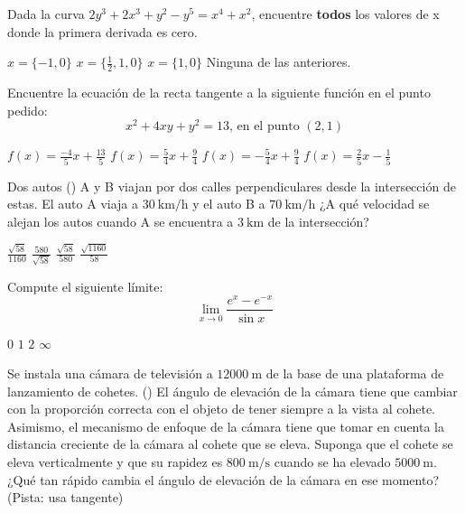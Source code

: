 \pregunta[5] %
Dada la curva $2y^3+2x^3+y^2-y^5=x^4+x^2$, encuentre \textbf{todos} los valores de x donde la primera derivada es cero.
\mostrarpuntaje

\begin{alternativas}
   \alternativa  $x = \{-1, 0\}$
   \alternativaCorrecta$x = \{\frac{1}{2}, 1,0\}$
   \alternativa $x = \{1, 0\}$
   \alternativa Ninguna de las anteriores.
\end{alternativas}
%
\pregunta[5]
Encuentre la ecuación de la recta tangente a la siguiente función en el punto pedido:
$$x^2 + 4xy + y^2 = 13 \text{, en el punto }(2,1)$$
\mostrarpuntaje
\begin{alternativas}
   \alternativaCorrecta $f(x) = \frac{-4}{5}x + \frac{13}{5}$
   \alternativa $f(x) = \frac{5}{4}x + \frac{9}{4}$
   \alternativa $f(x) = -\frac{5}{4}x + \frac{9}{4}$
   \alternativa $f(x) = \frac{2}{5}x - \frac{1}{5}$
\end{alternativas}
%
\pregunta[5]
Dos autos ({\emoji {}}) A y B viajan por dos calles perpendiculares desde la intersección de  estas. El auto A viaja a $\SI{30}{\kilo\meter\per\hour}$ y el auto B a $\SI{70}{\kilo\meter\per\hour}$ ¿A qué velocidad se alejan los autos cuando A se encuentra a $\SI{3}{\kilo\meter}$ de la intersección?
\mostrarpuntaje

\begin{alternativas}
   \alternativa  $\frac{\sqrt{58}}{1160}$
   \alternativaCorrecta$\frac{580}{\sqrt{58}}$
   \alternativa $\frac{\sqrt{58}}{580}$
   \alternativa $\frac{\sqrt{1160}}{58}$
\end{alternativas}
%
\pregunta[5]
Compute el siguiente límite:
$$\lim_{x\to0} \frac{e^x - e^{-x}}{\sin{x}}$$
\mostrarpuntaje

\begin{alternativas}
   \alternativa $0$
   \alternativa $1$
   \alternativaCorrecta$2$
   \alternativa $\infty$
\end{alternativas}
%
\pregunta[5]
Se instala una cámara de televisión a $\SI{12000}{\meter}$ de la base de una plataforma de lanzamiento de cohetes. ({\emoji {}}) El  ángulo de elevación de la cámara tiene que cambiar con la proporción correcta con el objeto de tener siempre a la vista al cohete. Asimismo, el mecanismo de enfoque de la cámara tiene que tomar en cuenta la distancia creciente de la cámara al cohete que se eleva. Suponga que el cohete se eleva verticalmente y que su rapidez es $\SI{800}{\meter\per\second}$ cuando se ha elevado $\SI{5000}{\meter}$. ¿Qué tan rápido cambia el ángulo de elevación de la cámara en ese momento? (Pista: usa tangente)
\mostrarpuntaje

